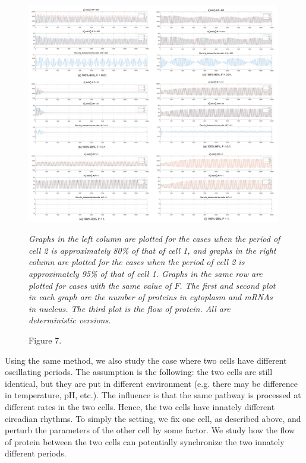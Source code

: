 \documentclass[12pt]{article}
\renewcommand{\(}{\left (}
\renewcommand{\)}{\right )}
\begin{document}
\begin{figure}[h]
    \centering
	\begin{minipage}{0.99\textwidth}
		\centering
		\includegraphics[width=0.99\textwidth]{diff_periods_combine.png}
		\caption*{\small Figure 7.}
	\end{minipage}
	\footnotesize
	\emph{Graphs in the left column are plotted for the cases when the period of cell 2 is approximately 80\% of that of cell 1, and graphs in the right column are plotted for the cases when the period of cell 2 is approximately 95\% of that of cell 1. Graphs in the same row are plotted for cases with the same value of $F$. The first and second plot in each graph are the number of proteins in cytoplasm and mRNAs in nucleus. The third plot is the flow of protein. All are deterministic versions.}
\end{figure}

 Using the same method, we also study the case where two cells have different oscillating periods. The assumption is the following: the two cells are still identical, but they are put in different environment (e.g. there may be difference in temperature, pH, etc.). The influence is that the same pathway is processed at different rates in the two cells. Hence, the two cells have innately different circadian rhythms. To simply the setting, we fix one cell, as described above, and perturb the parameters of the other cell by some factor. We study how the flow of protein between the two cells can potentially synchronize the two innately different periods.
\end{document}
